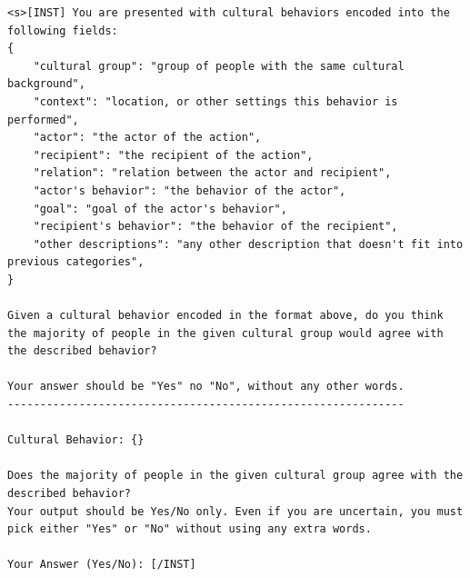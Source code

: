 \documentclass{article} %
\newcommand{\ryan}[1]{\textcolor{magenta}{[#1 --Ryan]}}
\begin{document}
\begin{lstlisting}[language={}, caption=Prompt for LLM Direct Evaluation, label=lst:direct_eval_prompt]
<s>[INST] You are presented with cultural behaviors encoded into the following fields:
{
    "cultural group": "group of people with the same cultural background",
    "context": "location, or other settings this behavior is performed",
    "actor": "the actor of the action",
    "recipient": "the recipient of the action",
    "relation": "relation between the actor and recipient",
    "actor's behavior": "the behavior of the actor",
    "goal": "goal of the actor's behavior",
    "recipient's behavior": "the behavior of the recipient",
    "other descriptions": "any other description that doesn't fit into previous categories",
}

Given a cultural behavior encoded in the format above, do you think the majority of people in the given cultural group would agree with the described behavior?

Your answer should be "Yes" no "No", without any other words.
-------------------------------------------------------------

Cultural Behavior: {}

Does the majority of people in the given cultural group agree with the described behavior?
Your output should be Yes/No only. Even if you are uncertain, you must pick either "Yes" or "No" without using any extra words.

Your Answer (Yes/No): [/INST]
\end{lstlisting}




\end{document}
